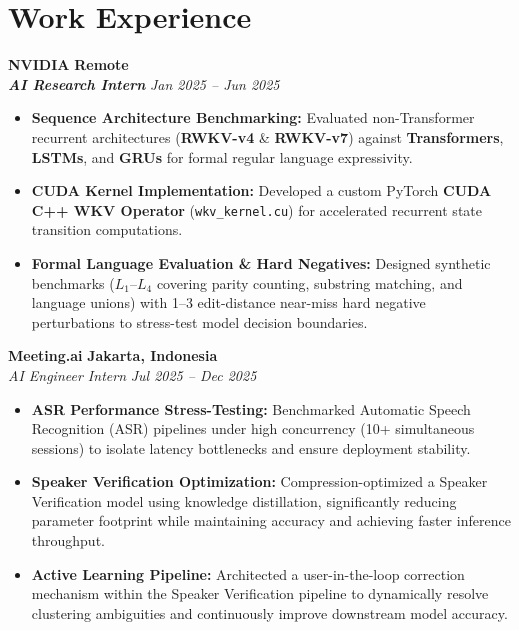 \documentclass[letterpaper,10pt]{article}
\begin{document}
\section{Work Experience}
\vspace{1pt}

\noindent \textbf{\large NVIDIA} \hfill \textbf{Remote} \\
\textit{\textbf{AI Research Intern}} \hfill \textit{Jan 2025 -- Jun 2025}
\begin{itemize}
    \item \textbf{Sequence Architecture Benchmarking:} Evaluated non-Transformer recurrent architectures (\textbf{RWKV-v4} \& \textbf{RWKV-v7}) against \textbf{Transformers}, \textbf{LSTMs}, and \textbf{GRUs} for formal regular language expressivity.
    \item \textbf{CUDA Kernel Implementation:} Developed a custom PyTorch \textbf{CUDA C++ WKV Operator} (\texttt{wkv\_kernel.cu}) for accelerated recurrent state transition computations.
    \item \textbf{Formal Language Evaluation \& Hard Negatives:} Designed synthetic benchmarks ($L_1$--$L_4$ covering parity counting, substring matching, and language unions) with 1--3 edit-distance near-miss hard negative perturbations to stress-test model decision boundaries.
\end{itemize}
\vspace{2pt}

\noindent \textbf{\large Meeting.ai} \hfill \textbf{Jakarta, Indonesia} \\
\textit{AI Engineer Intern} \hfill \textit{Jul 2025 -- Dec 2025}
\begin{itemize}
    \item \textbf{ASR Performance Stress-Testing:} Benchmarked Automatic Speech Recognition (ASR) pipelines under high concurrency (10+ simultaneous sessions) to isolate latency bottlenecks and ensure deployment stability.
    \item \textbf{Speaker Verification Optimization:} Compression-optimized a Speaker Verification model using knowledge distillation, significantly reducing parameter footprint while maintaining accuracy and achieving faster inference throughput.
    \item \textbf{Active Learning Pipeline:} Architected a user-in-the-loop correction mechanism within the Speaker Verification pipeline to dynamically resolve clustering ambiguities and continuously improve downstream model accuracy.
\end{itemize}
\vspace{2pt}
\end{document}
